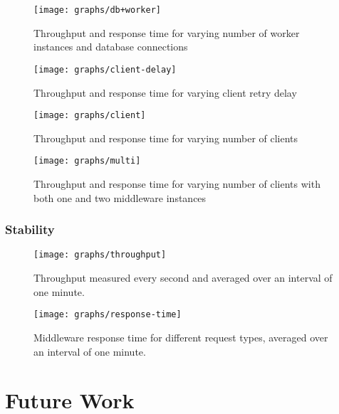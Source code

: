 \documentclass[a4paper, oneside]{csthesis}
\begin{document}
    \begin{figure}[ht]
    \centering
        \texttt{[image: graphs/db+worker]}
        \caption{Throughput and response time for varying number of worker instances and database connections}
        \label{fig:db+worker}
    \end{figure}

    \begin{figure}[ht]
    \centering
        \texttt{[image: graphs/client-delay]}
        \caption{Throughput and response time for varying client retry delay}
        \label{fig:client-delay}
    \end{figure}

    \begin{figure}[ht]
    \centering
        \texttt{[image: graphs/client]}
        \caption{Throughput and response time for varying number of clients}
        \label{fig:client}
    \end{figure}
    
    \begin{figure}[ht]
    \centering
        \texttt{[image: graphs/multi]}
        \caption{Throughput and response time for varying number of clients with both one and two middleware instances}
        \label{fig:multi}
    \end{figure}
    
\subsection{Stability}
    \begin{figure}[ht]
    \centering
        \texttt{[image: graphs/throughput]}
        \caption{Throughput measured every second and averaged over an interval of one minute.}
        \label{fig:throughput}
    \end{figure}
    
    \begin{figure}[ht]
    \centering
        \texttt{[image: graphs/response-time]}
        \caption{Middleware response time for different request types, averaged over an interval of one minute.}
        \label{fig:response-time}
    \end{figure}

\chapter{Future Work}
	
\end{document}
